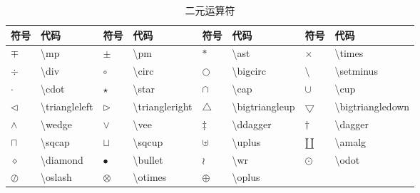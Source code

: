 \documentclass[UTF8,fontset=ubuntu]{ctexart}
\begin{document}
\begin{table}[H]
\begin{tabular}{l l l l l l l l}
	\hline
	符号 & 代码 & 符号 & 代码 & 符号 & 代码 & 符号 & 代码\\
	\hline
	$\mp$ & \textbackslash mp & $\pm$ & \textbackslash pm & $\ast$ & \textbackslash ast & $\times$ & \textbackslash times\\
	$\div$ & \textbackslash div & $\circ$ & \textbackslash circ & $\bigcirc$ & \textbackslash bigcirc & $\setminus$ & \textbackslash setminus\\
	$\cdot$ & \textbackslash cdot & $\star$ & \textbackslash star & $\cap$ & \textbackslash cap & $\cup$ & \textbackslash cup\\
	$\triangleleft$ & \textbackslash triangleleft & $\triangleright$ & \textbackslash triangleright & $\bigtriangleup$ & \textbackslash bigtriangleup & $\bigtriangledown$ & \textbackslash bigtriangledown\\
	$\wedge$ & \textbackslash wedge & $\vee$ & \textbackslash vee & $\ddagger$ & \textbackslash ddagger & $\dagger$ & \textbackslash dagger\\
	$\sqcap$ & \textbackslash sqcap & $\sqcup$ & \textbackslash sqcup & $\uplus$ & \textbackslash uplus & $\amalg$ & \textbackslash amalg\\
	$\diamond$ & \textbackslash diamond & $\bullet$ & \textbackslash bullet & $\wr$ & \textbackslash wr & $\odot$ & \textbackslash odot\\
	$\oslash$ & \textbackslash oslash & $\otimes$ & \textbackslash otimes & $\oplus$ & \textbackslash oplus\\
	\hline
\end{tabular}
\caption{二元运算符}
\end{table}
\end{document}
